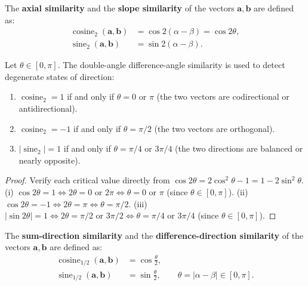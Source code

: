 \begin{definition}\label{def:double_diff_similarity}
The \textbf{axial similarity} and the \textbf{slope similarity} of the vectors $\mathbf{a}, \mathbf{b}$ are defined as:
\begin{align*}
\operatorname{cosine}_2(\mathbf{a}, \mathbf{b}) &= \cos 2(\alpha - \beta) = \cos 2\theta, \\
\operatorname{sine}_2(\mathbf{a}, \mathbf{b}) &= \sin 2(\alpha - \beta).
\end{align*}
\end{definition}

\begin{proposition}\label{prop:double_diff_degeneracy}
Let $\theta \in [0,\pi]$. The double-angle difference-angle similarity is used to detect degenerate states of direction:
\begin{enumerate}[label=(\roman*)]
    \item $\operatorname{cosine}_2 = 1$ if and only if $\theta = 0$ or $\pi$ (the two vectors are codirectional or antidirectional).
    \item $\operatorname{cosine}_2 = -1$ if and only if $\theta = \pi/2$ (the two vectors are orthogonal).
    \item $\lvert\operatorname{sine}_2\rvert = 1$ if and only if $\theta = \pi/4$ or $3\pi/4$ (the two directions are balanced or nearly opposite).
\end{enumerate}
\end{proposition}

\begin{proof}
Verify each critical value directly from $\cos 2\theta = 2\cos^2\theta - 1 = 1 - 2\sin^2\theta$. (i) $\cos 2\theta = 1 \iff 2\theta = 0 \text{ or } 2\pi \iff \theta = 0 \text{ or } \pi$ (since $\theta \in [0,\pi]$). (ii) $\cos 2\theta = -1 \iff 2\theta = \pi \iff \theta = \pi/2$. (iii) $\lvert\sin 2\theta\rvert = 1 \iff 2\theta = \pi/2 \text{ or } 3\pi/2 \iff \theta = \pi/4 \text{ or } 3\pi/4$ (since $\theta \in [0,\pi]$).
\end{proof}

\begin{definition}\label{def:half_diff_similarity}
The \textbf{sum-direction similarity} and the \textbf{difference-direction similarity} of the vectors $\mathbf{a}, \mathbf{b}$ are defined as:
\begin{align*}
\operatorname{cosine}_{1/2}(\mathbf{a}, \mathbf{b}) &= \cos\frac{\theta}{2}, \\
\operatorname{sine}_{1/2}(\mathbf{a}, \mathbf{b}) &= \sin\frac{\theta}{2}, \qquad \theta = \lvert\alpha-\beta\rvert \in [0,\pi].
\end{align*}
\end{definition}

